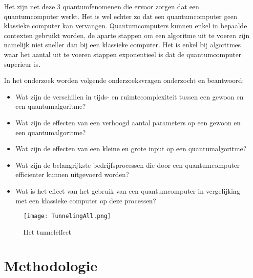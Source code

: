 Het zijn net deze 3 quantumfenomenen die ervoor zorgen dat een quantumcomputer werkt. Het is wel echter zo dat een quantumcomputer geen klassieke computer kan vervangen.
Quantumcomputers kunnen enkel in bepaalde contexten gebruikt worden, de aparte stappen om een algoritme uit te voeren zijn namelijk niet sneller dan bij een klassieke computer.
Het is enkel bij algoritmes waar het aantal uit te voeren stappen exponentieel is dat de quantumcomputer superieur is.

In het onderzoek worden volgende onderzoeksvragen onderzocht en beantwoord:
\begin{itemize}
  \item Wat zijn de verschillen in tijds- en ruimtecomplexiteit tussen een gewoon en een quantumalgoritme?
  \item Wat zijn de effecten van een verhoogd aantal parameters op een gewoon en een quantumalgoritme?
  \item Wat zijn de effecten van een kleine en grote input op een quantumalgoritme?
  \item Wat zijn de belangrijkste bedrijfsprocessen die door een quantumcomputer efficienter kunnen uitgevoerd worden?
  \item Wat is het effect van het gebruik van een quantumcomputer in vergelijking met een klassieke computer op deze processen?
\end{itemize}

\begin{figure} [h]
  \caption{Het tunneleffect}
  \centering
  \texttt{[image: TunnelingAll.png]}
  \end{figure}


\section{Methodologie}
\label{sec:methodologie}

